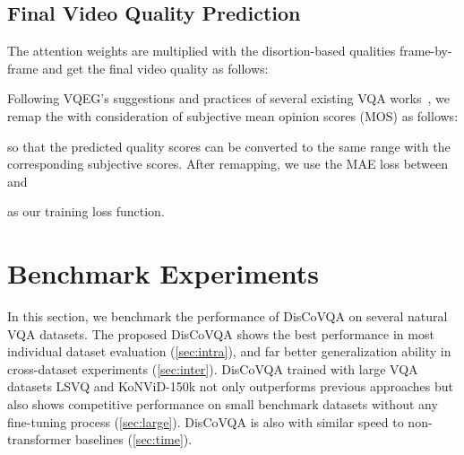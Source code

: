 \documentclass[journal]{IEEEtran}
\begin{document}
\subsection{Final Video Quality Prediction}
\label{sec:33}

The attention weights  are multiplied with the disortion-based qualities  frame-by-frame and get the final video quality  as follows:




Following VQEG's suggestions and practices of several existing VQA works~\cite{bvqa2022,vsfa}, we remap the  with consideration of subjective mean opinion scores (MOS)  as follows:
 
so that the predicted quality scores can be converted to the same range with the corresponding subjective scores. After remapping, we use the MAE loss between  and  

as our training loss function.




\section{Benchmark Experiments}
\label{sec:4}

In this section, we benchmark the performance of DisCoVQA on several natural VQA datasets. The proposed DisCoVQA shows the best performance in most individual dataset evaluation (\cref{sec:intra}), and far better generalization ability in cross-dataset experiments (\cref{sec:inter}). DisCoVQA trained with large VQA datasets LSVQ and KoNViD-150k not only outperforms previous approaches but also shows competitive performance on small benchmark datasets without any fine-tuning process (\cref{sec:large}).  DisCoVQA is also with similar speed to non-transformer baselines (\cref{sec:time}).
\end{document}
